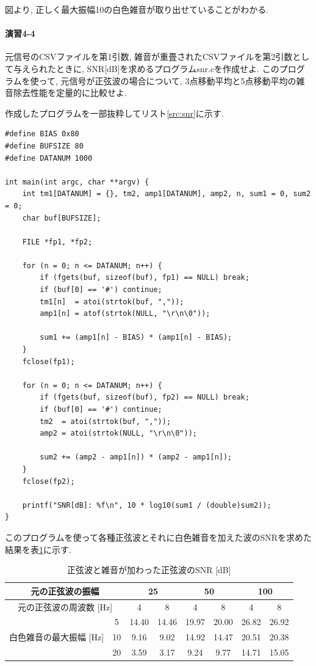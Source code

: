 \documentclass[titlepage]{jsarticle}
\begin{document}
        図より, 正しく最大振幅10の白色雑音が取り出せていることがわかる.

    \paragraph{演習4-4} 元信号のCSVファイルを第1引数, 雑音が重畳されたCSVファイルを第2引数として与えられたときに,
    SNR[dB]を求めるプログラムsnr.cを作成せよ. このプログラムを使って,
    元信号が正弦波の場合について, 3点移動平均と5点移動平均の雑音除去性能を定量的に比較せよ.
        
        作成したプログラムを一部抜粋してリスト\ref{src:snr}に示す.

        \begin{lstlisting}[caption=snr.c, label=src:snr]
#define BIAS 0x80
#define BUFSIZE 80
#define DATANUM 1000

int main(int argc, char **argv) {
    int tm1[DATANUM] = {}, tm2, amp1[DATANUM], amp2, n, sum1 = 0, sum2 = 0;
    char buf[BUFSIZE];

    FILE *fp1, *fp2;

    for (n = 0; n <= DATANUM; n++) {
        if (fgets(buf, sizeof(buf), fp1) == NULL) break;
        if (buf[0] == '#') continue;
        tm1[n]  = atoi(strtok(buf, ","));
        amp1[n] = atof(strtok(NULL, "\r\n\0"));

        sum1 += (amp1[n] - BIAS) * (amp1[n] - BIAS);
    }
    fclose(fp1);

    for (n = 0; n <= DATANUM; n++) {
        if (fgets(buf, sizeof(buf), fp2) == NULL) break;
        if (buf[0] == '#') continue;
        tm2  = atoi(strtok(buf, ","));
        amp2 = atoi(strtok(NULL, "\r\n\0"));

        sum2 += (amp2 - amp1[n]) * (amp2 - amp1[n]);
    }
    fclose(fp2);

    printf("SNR[dB]: %f\n", 10 * log10(sum1 / (double)sum2));
}\end{lstlisting}

        このプログラムを使って各種正弦波とそれに白色雑音を加えた波のSNRを求めた結果を表\ref{tab:snr1}に示す.

        \begin{table}[h]
            \centering
            \caption{正弦波と雑音が加わった正弦波のSNR [dB]}
            \label{tab:snr1}
            \begin{tabular}{c|c||cc|cc|cc} \hline
                \multicolumn{2}{c||}{元の正弦波の振幅} & \multicolumn{2}{c|}{25} & \multicolumn{2}{c|}{50} & \multicolumn{2}{c}{100} \\ \hline
                \multicolumn{2}{c||}{元の正弦波の周波数 [Hz]} & 4 & 8 & 4 & 8 & 4 & 8 \\ \hline \hline
                & 5 & 14.40 & 14.46 & 19.97 & 20.00 & 26.82 & 26.92 \\
                白色雑音の最大振幅 [Hz] & 10 & 9.16 & 9.02 & 14.92 & 14.47 & 20.51 & 20.38 \\
                & 20 & 3.59 & 3.17 & 9.24 & 9.77 & 14.71 & 15.05 \\ \hline
            \end{tabular}
        \end{table}
\end{document}
